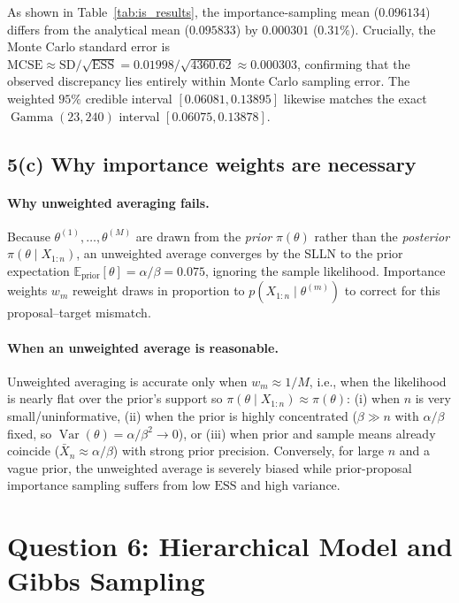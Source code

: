 \documentclass[11pt,a4paper]{article}
\begin{document}
As shown in Table~\ref{tab:is_results}, the importance-sampling mean ($0.096134$) differs from the analytical mean ($0.095833$) by $0.000301$ ($0.31\%$). Crucially, the Monte Carlo standard error is $\mathrm{MCSE} \approx \mathrm{SD}/\sqrt{\mathrm{ESS}} = 0.01998/\sqrt{4360.62} \approx 0.000303$, confirming that the observed discrepancy lies entirely within Monte Carlo sampling error. The weighted $95\%$ credible interval $[0.06081, 0.13895]$ likewise matches the exact $\operatorname{Gamma}(23, 240)$ interval $[0.06075, 0.13878]$.

\subsection*{5(c) Why importance weights are necessary}

\paragraph{Why unweighted averaging fails.}
Because $\theta^{(1)}, \dots, \theta^{(M)}$ are drawn from the \emph{prior} $\pi(\theta)$ rather than the \emph{posterior} $\pi(\theta \mid X_{1:n})$, an unweighted average converges by the SLLN to the prior expectation $\mathbb{E}_{\text{prior}}[\theta] = \alpha/\beta = 0.075$, ignoring the sample likelihood. Importance weights $w_m$ reweight draws in proportion to $p(X_{1:n} \mid \theta^{(m)})$ to correct for this proposal--target mismatch.

\paragraph{When an unweighted average is reasonable.}
Unweighted averaging is accurate only when $w_m \approx 1/M$, i.e., when the likelihood is nearly flat over the prior's support so $\pi(\theta \mid X_{1:n}) \approx \pi(\theta)$: (i) when $n$ is very small/uninformative, (ii) when the prior is highly concentrated ($\beta \gg n$ with $\alpha/\beta$ fixed, so $\operatorname{Var}(\theta) = \alpha/\beta^2 \to 0$), or (iii) when prior and sample means already coincide ($\bar{X}_n \approx \alpha/\beta$) with strong prior precision. Conversely, for large $n$ and a vague prior, the unweighted average is severely biased while prior-proposal importance sampling suffers from low $\mathrm{ESS}$ and high variance.

\section*{Question 6: Hierarchical Model and Gibbs Sampling}
\end{document}
